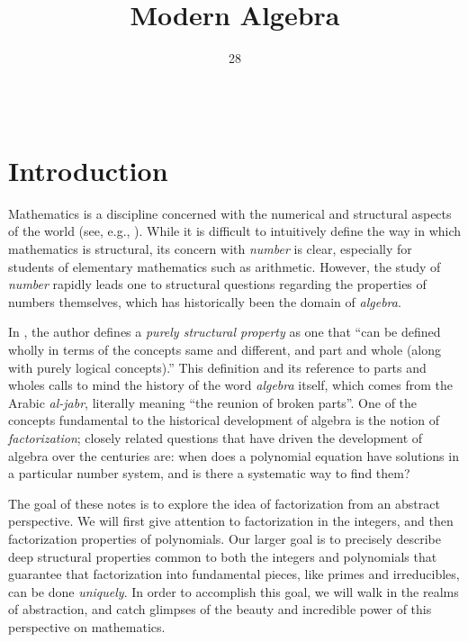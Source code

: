 \documentclass[english,course]{lecture}
\title{Modern Algebra}
\date{28}{08}{2018}
\theoremstyle{plain}
\begin{document}
\newpage 

$\,$

\newpage



\section*{Introduction}


Mathematics is a discipline concerned with the numerical and structural aspects of the world (see, e.g., \cite{franklin2014aristotelian}).
While it is difficult to intuitively define the way in which mathematics is structural, its concern with \emph{number} is clear, especially for students of elementary mathematics such as arithmetic.
However, the study of \emph{number} rapidly leads one to structural questions regarding the properties of numbers themselves, which has historically been the domain of \emph{algebra}.

In \cite{franklin2014aristotelian}, the author defines a \emph{purely structural property} as one that ``can be defined wholly in terms of the concepts same and different, and part and whole (along with purely logical concepts).''  
This definition and its reference to parts and wholes calls to mind the history of the word \emph{algebra} itself, which comes from the Arabic \emph{al-jabr}, literally meaning ``the reunion of broken parts''.
One of the concepts fundamental to the historical development of algebra is the notion of \emph{factorization}; closely related questions that have driven the development of algebra over the centuries are: when does a polynomial equation have solutions in a particular number system, and is there a systematic way to find them?

The goal of these notes is to explore the idea of factorization from an abstract perspective.
We will first give attention to factorization in the integers, and then factorization properties of polynomials.
Our larger goal is to precisely describe deep structural properties common to both the integers and polynomials that guarantee that factorization into fundamental pieces, like primes and irreducibles, can be done \emph{uniquely}. 
In order to accomplish this goal, we will walk in the realms of abstraction, and catch glimpses of the beauty and incredible power of this perspective on mathematics.
\end{document}
